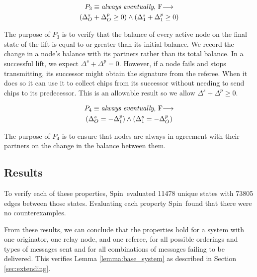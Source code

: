 \documentclass[runningheads]{llncs}
\newcommand{\originatorsuccbal}{\Delta^s_O}
\newcommand{\relayasuccbal}{\Delta^s_1}
\newcommand{\originatorpredbal}{\Delta^p_O}
\newcommand{\relayapredbal}{\Delta^p_1}
\newcommand{\always}{\emph{always}}
\newcommand{\eventually}{\emph{eventually}}
\newcommand{\fair}{$F$}
\newcommand{\secref}[1]{Section \ref{#1}}
\newcommand{\spin}{Spin}
\newif\ifcomments
\newif\ifkylecomments
\newcommand{\egm}[1]{\ifcomments\textcolor{orange}{egm: #1}\fi}
\newcommand{\krs}[1]{\ifkylecomments\textcolor{blue}{krs: #1}\fi}
\begin{document}
\begin{definition}[Property 3]
\begin{multline*}
P_3 \equiv \always\ \eventually,\ \fair \longrightarrow \\
    (\originatorsuccbal + \originatorpredbal \ge 0) \wedge
    (\relayasuccbal + \relayapredbal \ge 0)\\
\end{multline*}
\end{definition}

The purpose of $P_3$ is to verify that the balance of every active node on the final state of the lift is equal to or greater than its initial balance. We record the change in a node's balance with its partners rather than its total balance. In a successful lift, we expect $\Delta^s + \Delta^p = 0$. However, if a node fails and stops transmitting, its successor might obtain the signature from the referee. When it does so it can use it to collect chips from its successor without needing to send chips to its predecessor. This is an allowable result so we allow $\Delta^s + \Delta^p \ge 0$.
\krs{should be 0, good catch \egm{On the previous inequality, should the `1` by a `0`?}}

\begin{definition}[Property 4]
\begin{multline*}
P_4 \equiv \always\ \eventually,\ \fair \longrightarrow \\
    (\originatorsuccbal = -\relayapredbal) \wedge
    (\relayasuccbal = -\originatorpredbal) \\
\end{multline*}
\end{definition}


The purpose of $P_4$ is to ensure that nodes are always in agreement with their partners on the change in the balance between them. 



\subsection{Results}

To verify each of these properties, \spin\ evaluated 
11478 unique states with 73805 edges between those states. Evaluating each property \spin\ found that there were no counterexamples. 

From these results, we can conclude that the properties hold for a system with one originator, one relay node, and one referee, for all possible orderings and types of messages sent and for all combinations of messages failing to be delivered. This verifies Lemma \ref{lemma:base_system} as described in \secref{sec:extending}.
\end{document}

